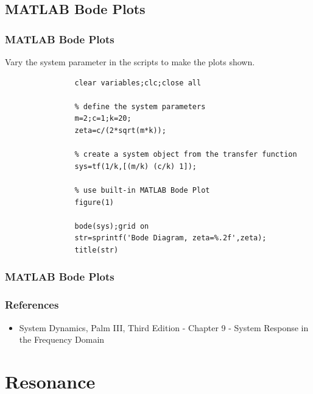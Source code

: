 \documentclass[fleqn]{beamer} %
\newcommand{\sectionIVtitle}{Resonance}
\newcommand{\sectionIIIsubsectionIVtitle}{MATLAB Bode Plots}
\begin{document}
		\subsection{\sectionIIIsubsectionIVtitle}\label{sectionIIIsubsectionIV}	

			\begin{frame}[containsverbatim]
				\frametitle{\sectionIIIsubsectionIVtitle}
				\bigskip

				Vary the system parameter in the scripts to make the plots shown. 

				\begin{lstlisting}
				clear variables;clc;close all

				% define the system parameters
				m=2;c=1;k=20;
				zeta=c/(2*sqrt(m*k));

				% create a system object from the transfer function
				sys=tf(1/k,[(m/k) (c/k) 1]);

				% use built-in MATLAB Bode Plot
				figure(1)

				bode(sys);grid on
				str=sprintf('Bode Diagram, zeta=%.2f',zeta);
				title(str)
				\end{lstlisting}

				\btVFill 
			\end{frame}

			\begin{frame}
				\frametitle{\sectionIIIsubsectionIVtitle}
				\bigskip

				\frametitle{References}

				\begin{itemize}
					\item System Dynamics, Palm III, Third Edition - Chapter 9 - System Response in the Frequency Domain
				\end{itemize}
			
		 		\btVFill 
			\end{frame}

	\section{\sectionIVtitle}\label{sectionIV}
\end{document}
